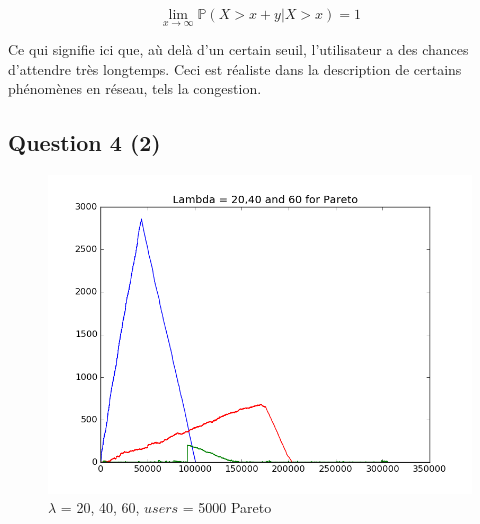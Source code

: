 \documentclass[12pt]{article}
\begin{document}
\[\lim\limits_{x \to  \infty} \mathbb{P}(X > x+y | X > x) = 1\]

Ce qui signifie ici que, aù delà d'un certain seuil, l'utilisateur a des chances d'attendre très longtemps. Ceci est réaliste dans la description de certains phénomènes en réseau, tels la congestion.

\subsection{Question 4 (2)}
\begin{figure}[H]
\centering
\includegraphics[scale=0.50]{3lambdapareto.png}
\caption{\label{fig:rf_taille_noeud} $\lambda$ = 20, 40, 60, $users$ = 5000 Pareto}
\end{figure}
\end{document}
